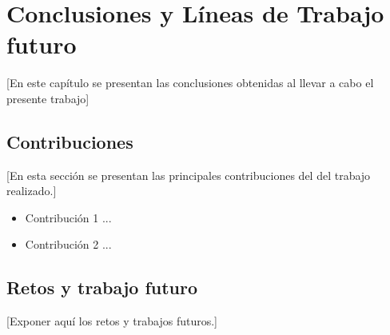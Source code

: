 \chapter{Conclusiones y Líneas de Trabajo futuro}\label{cap:conclusiones}

[En este capítulo se presentan las conclusiones obtenidas al llevar a cabo el presente trabajo]

\section{Contribuciones}

[En esta sección se presentan las principales contribuciones del del trabajo realizado.]

\begin{itemize}
    
    \item Contribución 1 ...
    
    \item Contribución 2 ...
    
\end{itemize}

\section{Retos y trabajo futuro}

[Exponer aquí los retos y trabajos futuros.]